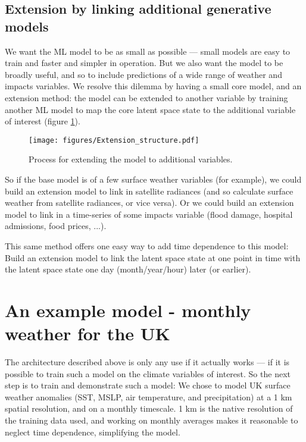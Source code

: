 \documentclass[gmd,manuscript]{copernicus}
\begin{document}
\subsection{Extension by linking additional generative models}
\label{extension}

We want the ML model to be as small as possible --- small models are easy to train and faster and simpler in operation. But we also want the model to be broadly useful, and so to include predictions of a wide range of weather and impacts variables. We resolve this dilemma by having a small core model, and an extension method: the model can be extended to another variable by training another ML model to map the core latent space state to the additional variable of interest (figure \ref{Extension_structure}).

\begin{figure}[h]
\texttt{[image: figures/Extension\_structure.pdf]}
\caption{Process for extending the model to additional variables.}
\label{Extension_structure}
\end{figure}
     
So if the base model is of a few surface weather variables (for example), we could build an extension model to link in satellite radiances (and so calculate surface weather from satellite radiances, or vice versa). Or we could build an extension model to link in a time-series of some impacts variable (flood damage, hospital admissions, food prices, ...). 

This same method offers one easy way to add time dependence to this model: Build an extension model to link the latent space state at one point in time with the latent space state one day (month/year/hour) later (or earlier).


\section{An example model - monthly weather for the UK}

The architecture described above is only any use if it actually works --- if it is possible to train such a model on the climate variables of interest. So the next step is to train and demonstrate such a model: We chose to model UK surface weather anomalies (SST, MSLP, air temperature, and precipitation) at a 1 km spatial resolution, and on a monthly timescale. 1 km is the native resolution of the training data used, and working on monthly averages makes it reasonable to neglect time dependence, simplifying the model.
\end{document}

